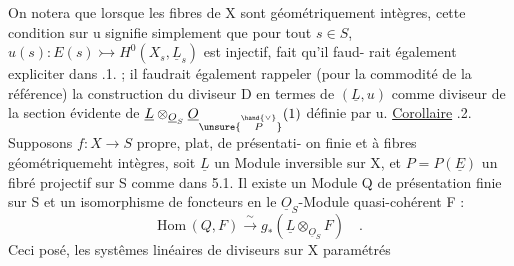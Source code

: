 On notera que lorsque les fibres de X sont 
géométriquement intègres, cette condition sur u signifie simplement que
pour tout $s\in S$, $u(s): E(s)\rightarrowtail H^{0}(X_s,\underline{L}_s)$ est injectif, fait qu'il faud-%
rait également expliciter dans .1. ;  il faudrait également rappeler
(pour la commodité de la référence) la construction du diviseur D en
termes de $(\underline{L},u)$ comme diviseur de la section évidente  de $\underline{L}\otimes_{\underline{O}_S}\underline{O}_{\unsure{\overset{\hand{\vee}}{P}}}(1)$
définie par u.
\uline{Corollaire} .2.  Supposons $f: X\longrightarrow S$ propre, plat, de présentati-%
on finie et à fibres géométriquemeht intègres,  soit $\underline{L}$ un Module
inversible sur X, et $P=P(\underline{E})$ un fibré projectif sur S comme dans 5.1.
 Il existe un Module Q de présentation finie sur S et un
isomorphisme de foncteurs en le $\underline{O}_S$-Module quasi-cohérent F :
\[ \mathrm{Hom}\,(Q,F) \xrightarrow{\ \sim\ } g_*(\underline{L}\otimes_{\underline{O}_S}F) \quad . \]
Ceci posé, les  systêmes linéaires de diviseurs sur X paramétrés

